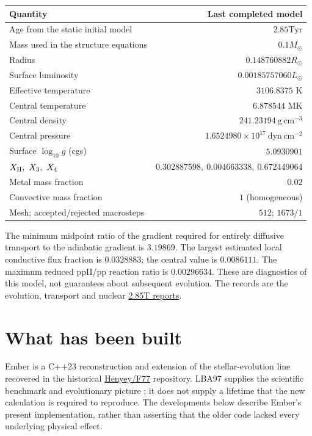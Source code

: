 \documentclass[11pt,letterpaper]{article}
\newcommand{\Ms}{M_\odot}
\newcommand{\Rs}{R_\odot}
\newcommand{\Ls}{L_\odot}
\newcommand{\Tyr}{\mathrm{Tyr}}
\newcommand{\doc}[2]{\href{https://github.com/oklo/ember/blob/master/#1}{#2}}
\begin{document}
\begin{center}
\begin{tabular}{@{}lr@{}}
\toprule
Quantity & Last completed model \\
\midrule
Age from the static initial model & $2.85\Tyr$ \\
Mass used in the structure equations & $0.1\Ms$ \\
Radius & $0.148760882\Rs$ \\
Surface luminosity & $0.00185757060\Ls$ \\
Effective temperature & $3106.8375$ K \\
Central temperature & $6.878544$ MK \\
Central density & $241.23194\ \mathrm{g\,cm^{-3}}$ \\
Central pressure & $1.6524980\times10^{17}\ \mathrm{dyn\,cm^{-2}}$ \\
Surface $\log_{10}g$ (cgs) & $5.0930901$ \\
$X_{\rm H},\ X_3,\ X_4$ & $0.302887598,\ 0.004663338,\ 0.672449064$ \\
Metal mass fraction & $0.02$ \\
Convective mass fraction & $1$ (homogeneous) \\
Mesh; accepted/rejected macrosteps & $512$; $1673/1$ \\
\bottomrule
\end{tabular}
\end{center}

The minimum midpoint ratio of the gradient required for entirely diffusive
transport to the adiabatic gradient is $3.19869$. The largest estimated local
conductive flux fraction is $0.0328883$; the central value is $0.0086111$.
The maximum reduced ppII/pp reaction ratio is $0.00296634$.
These are diagnostics of this model, not guarantees about subsequent evolution.
The records are the evolution, transport and nuclear
\doc{docs/results/evolution_metal_m010_2850gyr_gas.json}{2.85T reports}.

\section{What has been built}
Ember is a C++23 reconstruction and extension of the stellar-evolution line
recovered in the historical \href{https://github.com/oklo/Henyey}{Henyey/F77}
repository. LBA97 supplies the scientific benchmark and evolutionary picture
\cite{lba97}; it does not supply a lifetime that the new calculation is required
to reproduce. The developments below describe Ember's present implementation,
rather than asserting that the older code lacked every underlying physical effect.
\end{document}
